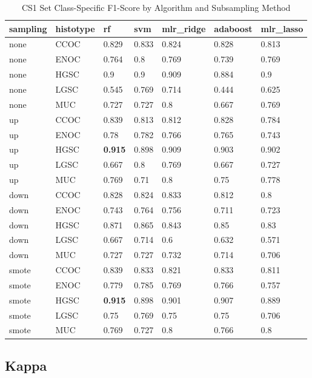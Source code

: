 \documentclass[
]{report}
\begin{document}
\begin{table}

\caption{\label{tab:cs1-f1-class-table}CS1 Set Class-Specific F1-Score by Algorithm and Subsampling Method}
\centering
\begin{tabular}[t]{l|l|l|l|l|l|l}
\hline
sampling & histotype & rf & svm & mlr\_ridge & adaboost & mlr\_lasso\\
\hline
none & CCOC & 0.829 & 0.833 & 0.824 & 0.828 & 0.813\\
\hline
none & ENOC & 0.764 & 0.8 & 0.769 & 0.739 & 0.769\\
\hline
none & HGSC & 0.9 & 0.9 & 0.909 & 0.884 & 0.9\\
\hline
none & LGSC & 0.545 & 0.769 & 0.714 & 0.444 & 0.625\\
\hline
none & MUC & 0.727 & 0.727 & 0.8 & 0.667 & 0.769\\
\hline
up & CCOC & 0.839 & 0.813 & 0.812 & 0.828 & 0.784\\
\hline
up & ENOC & 0.78 & 0.782 & 0.766 & 0.765 & 0.743\\
\hline
up & HGSC & \textbf{0.915} & 0.898 & 0.909 & 0.903 & 0.902\\
\hline
up & LGSC & 0.667 & 0.8 & 0.769 & 0.667 & 0.727\\
\hline
up & MUC & 0.769 & 0.71 & 0.8 & 0.75 & 0.778\\
\hline
down & CCOC & 0.828 & 0.824 & 0.833 & 0.812 & 0.8\\
\hline
down & ENOC & 0.743 & 0.764 & 0.756 & 0.711 & 0.723\\
\hline
down & HGSC & 0.871 & 0.865 & 0.843 & 0.85 & 0.83\\
\hline
down & LGSC & 0.667 & 0.714 & 0.6 & 0.632 & 0.571\\
\hline
down & MUC & 0.727 & 0.727 & 0.732 & 0.714 & 0.706\\
\hline
smote & CCOC & 0.839 & 0.833 & 0.821 & 0.833 & 0.811\\
\hline
smote & ENOC & 0.779 & 0.785 & 0.769 & 0.766 & 0.757\\
\hline
smote & HGSC & \textbf{0.915} & 0.898 & 0.901 & 0.907 & 0.889\\
\hline
smote & LGSC & 0.75 & 0.769 & 0.75 & 0.75 & 0.706\\
\hline
smote & MUC & 0.769 & 0.727 & 0.8 & 0.766 & 0.8\\
\hline
\end{tabular}
\end{table}

\hypertarget{kappa-2}{%
\subsection{Kappa}\label{kappa-2}}
\end{document}

